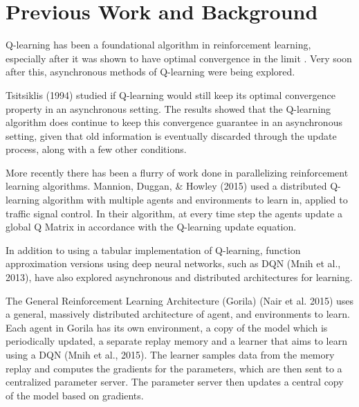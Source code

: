 \documentclass[jair,twoside,11pt,theapa]{article}
\begin{document}


\section{Previous Work and Background}
\label{Literature Survey}
Q-learning \cite{watkins} has been a foundational algorithm in reinforcement learning, especially after it was shown to have optimal convergence in the limit \cite{qlearning}. Very soon after this, asynchronous methods of Q-learning were being explored.  

Tsitsiklis (1994) \nocite{Tsitsiklis1994} studied if Q-learning would still keep its optimal convergence property in an asynchronous setting. The results showed that the Q-learning algorithm does continue to keep this convergence guarantee in an asynchronous setting, given that old information is eventually discarded through the update process, along with a few other conditions. 

More recently there has been a flurry of work done in parallelizing reinforcement learning algorithms. Mannion, Duggan, \& Howley (2015) \nocite{MANNION2015956} used a distributed Q-learning algorithm with multiple agents and environments to learn in, applied to traffic signal control. In their algorithm, at every time step the agents update a global Q Matrix in accordance with the Q-learning update equation. 

In addition to using a tabular implementation of Q-learning, function approximation versions using deep neural networks, such as DQN (Mnih et al., 2013), have also explored asynchronous and distributed architectures for learning. 

The General Reinforcement Learning Architecture (Gorila) (Nair et al. 2015)\nocite{Gorila} uses a general, massively distributed architecture of agent, and environments to learn. Each agent in Gorila has its own environment, a copy of the model which is periodically updated, a separate replay memory and a learner that aims to learn using a DQN (Mnih et al., 2015)\nocite{Mnih2015}. The learner samples data from the memory replay and computes the gradients for the parameters, which are then sent to a centralized parameter server. The parameter server then updates a central copy of the model based on gradients. 
\end{document}
